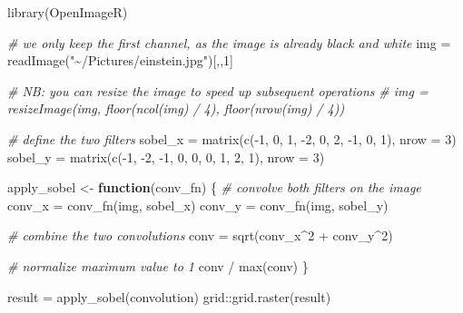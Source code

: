 \documentclass[
  a4paper,
]{article}
\newenvironment{Shaded}{\begin{snugshade}}{\end{snugshade}}
\newcommand{\AttributeTok}[1]{\textcolor[rgb]{0.77,0.63,0.00}{#1}}
\newcommand{\CommentTok}[1]{\textcolor[rgb]{0.56,0.35,0.01}{\textit{#1}}}
\newcommand{\ControlFlowTok}[1]{\textcolor[rgb]{0.13,0.29,0.53}{\textbf{#1}}}
\newcommand{\DecValTok}[1]{\textcolor[rgb]{0.00,0.00,0.81}{#1}}
\newcommand{\FunctionTok}[1]{\textcolor[rgb]{0.00,0.00,0.00}{#1}}
\newcommand{\NormalTok}[1]{#1}
\newcommand{\OtherTok}[1]{\textcolor[rgb]{0.56,0.35,0.01}{#1}}
\newcommand{\SpecialCharTok}[1]{\textcolor[rgb]{0.00,0.00,0.00}{#1}}
\newcommand{\StringTok}[1]{\textcolor[rgb]{0.31,0.60,0.02}{#1}}
\begin{document}
\begin{Shaded}
\begin{Highlighting}[]
\FunctionTok{library}\NormalTok{(OpenImageR)}

\CommentTok{\# we only keep the first channel, as the image is already black and white}
\NormalTok{img }\OtherTok{=} \FunctionTok{readImage}\NormalTok{(}\StringTok{"\textasciitilde{}/Pictures/einstein.jpg"}\NormalTok{)[,,}\DecValTok{1}\NormalTok{]}

\CommentTok{\# NB: you can resize the image to speed up subsequent operations}
\CommentTok{\# img = resizeImage(img, floor(ncol(img) / 4), floor(nrow(img) / 4))}

\CommentTok{\# define the two filters}
\NormalTok{sobel\_x }\OtherTok{=} \FunctionTok{matrix}\NormalTok{(}\FunctionTok{c}\NormalTok{(}\SpecialCharTok{{-}}\DecValTok{1}\NormalTok{, }\DecValTok{0}\NormalTok{, }\DecValTok{1}\NormalTok{, }\SpecialCharTok{{-}}\DecValTok{2}\NormalTok{, }\DecValTok{0}\NormalTok{, }\DecValTok{2}\NormalTok{, }\SpecialCharTok{{-}}\DecValTok{1}\NormalTok{, }\DecValTok{0}\NormalTok{, }\DecValTok{1}\NormalTok{), }\AttributeTok{nrow =} \DecValTok{3}\NormalTok{)}
\NormalTok{sobel\_y }\OtherTok{=} \FunctionTok{matrix}\NormalTok{(}\FunctionTok{c}\NormalTok{(}\SpecialCharTok{{-}}\DecValTok{1}\NormalTok{, }\SpecialCharTok{{-}}\DecValTok{2}\NormalTok{, }\SpecialCharTok{{-}}\DecValTok{1}\NormalTok{, }\DecValTok{0}\NormalTok{, }\DecValTok{0}\NormalTok{, }\DecValTok{0}\NormalTok{, }\DecValTok{1}\NormalTok{, }\DecValTok{2}\NormalTok{, }\DecValTok{1}\NormalTok{), }\AttributeTok{nrow =} \DecValTok{3}\NormalTok{)}

\NormalTok{apply\_sobel }\OtherTok{\textless{}{-}} \ControlFlowTok{function}\NormalTok{(conv\_fn) \{}
  \CommentTok{\# convolve both filters on the image}
\NormalTok{  conv\_x }\OtherTok{=} \FunctionTok{conv\_fn}\NormalTok{(img, sobel\_x)}
\NormalTok{  conv\_y }\OtherTok{=} \FunctionTok{conv\_fn}\NormalTok{(img, sobel\_y)}
  
  \CommentTok{\# combine the two convolutions}
\NormalTok{  conv }\OtherTok{=} \FunctionTok{sqrt}\NormalTok{(conv\_x}\SpecialCharTok{\^{}}\DecValTok{2} \SpecialCharTok{+}\NormalTok{ conv\_y}\SpecialCharTok{\^{}}\DecValTok{2}\NormalTok{)}
  
  \CommentTok{\# normalize maximum value to 1}
\NormalTok{  conv }\SpecialCharTok{/} \FunctionTok{max}\NormalTok{(conv)}
\NormalTok{\}}


\NormalTok{result }\OtherTok{=} \FunctionTok{apply\_sobel}\NormalTok{(convolution)}
\NormalTok{grid}\SpecialCharTok{::}\FunctionTok{grid.raster}\NormalTok{(result)}
\end{Highlighting}
\end{Shaded}
\end{document}

